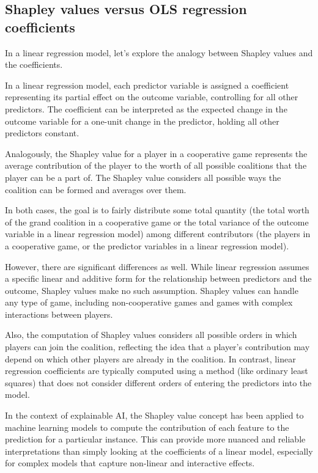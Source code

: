 \documentclass[
  letterpaper,
  DIV=11,
  numbers=noendperiod]{scrartcl}
\begin{document}
\hypertarget{shapley-values-versus-ols-regression-coefficients}{%
\subsection{Shapley values versus OLS regression
coefficients}\label{shapley-values-versus-ols-regression-coefficients}}

In a linear regression model, let's explore the analogy between Shapley
values and the coefficients.

In a linear regression model, each predictor variable is assigned a
coefficient representing its partial effect on the outcome variable,
controlling for all other predictors. The coefficient can be interpreted
as the expected change in the outcome variable for a one-unit change in
the predictor, holding all other predictors constant.

Analogously, the Shapley value for a player in a cooperative game
represents the average contribution of the player to the worth of all
possible coalitions that the player can be a part of. The Shapley value
considers all possible ways the coalition can be formed and averages
over them.

In both cases, the goal is to fairly distribute some total quantity (the
total worth of the grand coalition in a cooperative game or the total
variance of the outcome variable in a linear regression model) among
different contributors (the players in a cooperative game, or the
predictor variables in a linear regression model).

However, there are significant differences as well. While linear
regression assumes a specific linear and additive form for the
relationship between predictors and the outcome, Shapley values make no
such assumption. Shapley values can handle any type of game, including
non-cooperative games and games with complex interactions between
players.

Also, the computation of Shapley values considers all possible orders in
which players can join the coalition, reflecting the idea that a
player's contribution may depend on which other players are already in
the coalition. In contrast, linear regression coefficients are typically
computed using a method (like ordinary least squares) that does not
consider different orders of entering the predictors into the model.

In the context of explainable AI, the Shapley value concept has been
applied to machine learning models to compute the contribution of each
feature to the prediction for a particular instance. This can provide
more nuanced and reliable interpretations than simply looking at the
coefficients of a linear model, especially for complex models that
capture non-linear and interactive effects.
\end{document}
